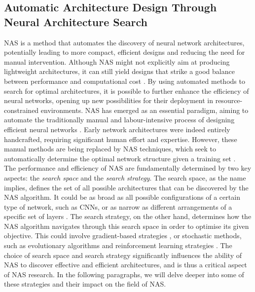 
\subsection{Automatic Architecture Design Through Neural Architecture Search}\label{sec:sota:nas} 

\acf{NAS} is a method that automates the discovery of neural network
architectures, potentially leading to more compact, efficient designs and
reducing the need for manual intervention. Although \ac{NAS} might not
explicitly aim at producing lightweight architectures, it can still yield
designs that strike a good balance between performance and computational cost
\cite{DBLP:conf/cvpr/TanCPVSHL19,DBLP:conf/icml/TanL19}. By using automated
methods to search for optimal architectures, it is possible to further enhance
the efficiency of neural networks, opening up new possibilities for their
deployment in resource-constrained environments. \ac{NAS} has emerged as an
essential paradigm, aiming to automate the traditionally manual and
labour-intensive process of designing efficient neural networks
\cite{DBLP:journals/corr/MiikkulainenLMR17}. Early network architectures were
indeed entirely handcrafted, requiring significant human effort and expertise.
However, these manual methods are being replaced by \ac{NAS} techniques, which
seek to automatically determine the optimal network structure given a training
set \cite{DBLP:journals/corr/abs-2301-08727,elsken2019neural}.\\

The performance and efficiency of \ac{NAS} are fundamentally determined by two
key aspects: the \emph{search space} and the \emph{search strategy}. The search
space, as the name implies, defines the set of all possible architectures that
can be discovered by the \ac{NAS} algorithm. It could be as broad as all
possible configurations of a certain type of network, such as \acp{CNN}, or as
narrow as different arrangements of a specific set of layers
\cite{DBLP:conf/cvpr/LiuCSAHY019}. The search strategy, on the other hand,
determines how the \ac{NAS} algorithm navigates through this search space in
order to optimise its given objective. This could involve gradient-based
strategies \cite{DBLP:conf/iclr/LiuSY19,DBLP:conf/iclr/XuX0CQ0X20}, or
stochastic methods, such as evolutionary algorithms and reinforcement learning
strategies \cite{DBLP:conf/iclr/ZophL17,DBLP:conf/icml/RealMSSSTLK17}. The
choice of search space and search strategy significantly influences the ability
of \ac{NAS} to discover effective and efficient architectures, and is thus a
critical aspect of NAS research. In the following paragraphs, we will delve
deeper into some of these strategies and their impact on the field of
\ac{NAS}.\\



